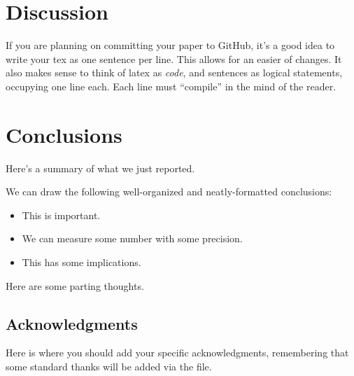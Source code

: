 \documentclass[\docopts]{\docclass}
\begin{document}

\section{Discussion}
\label{sec:discussion}

If you are planning on committing your paper to GitHub, it's a good idea to write your tex as one sentence per line.
This allows for an easier  of changes.
It also makes sense to think of latex as \emph{code}, and sentences as logical statements, occupying one line each.
Each line must ``compile'' in the mind of the reader.



\section{Conclusions}
\label{sec:conclusions}

Here's a summary of what we just reported.

We can draw the following well-organized and neatly-formatted conclusions:
\begin{itemize}
  \item This is important.
  \item We can measure some number with some precision.
  \item This has some implications.
\end{itemize}

Here are some parting thoughts.



\subsection*{Acknowledgments}

Here is where you should add your specific acknowledgments, remembering that some standard thanks will be added via the  file.





\end{document}
